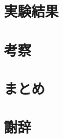 \documentclass[dvipdfmx]{jsreport}
\numberwithin{equation}{chapter}
\numberwithin{table}{chapter}
\begin{document}
\chapter{実験結果}
\chapter{考察}
\chapter{まとめ}
\chapter{謝辞}




\nocite{st,Peskin,spin_oxford,alma9926360528004034,alma990023076750204034,alma990023937250204034,ku}
\end{document}
